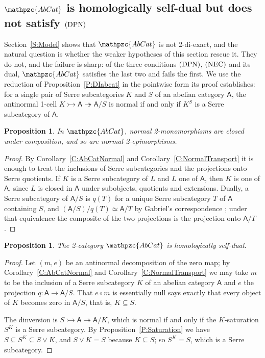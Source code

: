 \documentclass[reqno,a4paper]{amsart}
\numberwithin{equation}{section}
\theoremstyle{plain}
\newtheorem{proposition}[subsection]{Proposition}
\theoremstyle{definition}
\def\nameit#1{\textrm{#1}~}
\def\prox{\nameit{Proposition}}
\def\corx{\nameit{Corollary}}
\newcommand{\comp}{\circ}
\newcommand{\catfont}[1]{\ensuremath{\mathpzc{#1}}\xspace}
\newcommand{\onecat}[1]{\ensuremath{\mathsf{#1}}\xspace}
\newcommand{\AbCat}{\catfont{AbCat}}
\renewcommand{\1}{\onecat{1}}
\newcommand{\DPN}{\textup{(DPN)}}
\newcommand{\NEC}{\textup{(NEC)}}
\begin{document}
\subsection{\texorpdfstring{\(\AbCat\)}{AbCat} is homologically self-dual but does not satisfy \texorpdfstring{\(\DPN\)}{(DPN)}}\label{SS:NSDAbCat}

Section~\ref{S:Model} shows that \(\AbCat\) is not 2-di-exact, and the natural question is whether the weaker hypotheses of this section rescue it. They do not, and the failure is sharp: of the three conditions \(\DPN\), \(\NEC\) and its dual, \(\AbCat\) satisfies the last two and fails the first. We use the reduction of \prox\ref{P:DIabcat} in the pointwise form its proof establishes: for a single pair of Serre subcategories \(K\) and \(S\) of an abelian category \(\onecat{A}\), the antinormal 1-cell \(K\rightarrowtail\onecat{A}\twoheadrightarrow\onecat{A}/S\) is normal if and only if \(K^{S}\) is a Serre subcategory of \(\onecat{A}\).

\begin{proposition}\label{P:AbCatComposition}
	In \(\AbCat\), normal 2-monomorphisms are closed under composition, and so are normal 2-epimorphisms.
\end{proposition}
\begin{proof}
	By \corx\ref{C:AbCatNormal} and \corx\ref{C:NormalTransport} it is enough to treat the inclusions of Serre subcategories and the projections onto Serre quotients. If \(K\) is a Serre subcategory of \(L\) and \(L\) one of \(\onecat{A}\), then \(K\) is one of \(\onecat{A}\), since \(L\) is closed in \(\onecat{A}\) under subobjects, quotients and extensions. Dually, a Serre subcategory of \(\onecat{A}/S\) is \(q(T)\) for a unique Serre subcategory \(T\) of \(\onecat{A}\) containing \(S\), and \((\onecat{A}/S)/q(T)\simeq\onecat{A}/T\) by Gabriel's correspondence \cite[Chapter~III]{Gabriel62}; under that equivalence the composite of the two projections is the projection onto \(\onecat{A}/T\).
\end{proof}

\begin{proposition}\label{P:AbCatHSD}
	The 2-category \(\AbCat\) is homologically self-dual.
\end{proposition}
\begin{proof}
	Let \((m,e)\) be an antinormal decomposition of the zero map; by \corx\ref{C:AbCatNormal} and \corx\ref{C:NormalTransport} we may take \(m\) to be the inclusion of a Serre subcategory \(K\) of an abelian category \(\onecat{A}\) and \(e\) the projection \(q\colon\onecat{A}\to\onecat{A}/S\). That \(e\comp m\) is essentially null says exactly that every object of \(K\) becomes zero in \(\onecat{A}/S\), that is, \(K\subseteq S\).

	The dinversion is \(S\rightarrowtail\onecat{A}\twoheadrightarrow\onecat{A}/K\), which is normal if and only if the \(K\)-saturation \(S^{K}\) is a Serre subcategory. By \prox\ref{P:Saturation} we have \(S\subseteq S^{K}\subseteq S\vee K\), and \(S\vee K=S\) because \(K\subseteq S\); so \(S^{K}=S\), which is a Serre subcategory.
\end{proof}
\end{document}
